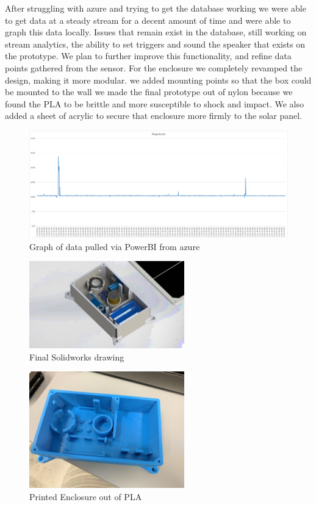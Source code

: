 \documentclass[11pt]{article}
\begin{document}
After struggling with azure and trying to get the database working we were able to get data at a steady stream for a decent amount of time and were able to graph this data locally. Issues that remain exist in the database, still working on stream analytics, the ability to set triggers and sound the speaker that exists on the prototype. We plan to further improve this functionality, and refine data points gathered from the sensor. 
	For the enclosure we completely revamped the design, making it more modular. we added mounting points so that the box could be mounted to the wall we made the final prototype out of nylon because we found the PLA to be brittle and more susceptible to shock and impact. We also added a sheet of acrylic to secure that enclosure more firmly to the solar panel.  
\begin{figure}[H]
\centering
\includegraphics[width=1\textwidth]{grdata_azure}
\caption{Graph of data pulled via PowerBI from azure}
\label{fig:graphical data}
\end{figure}

\begin{figure}[H]
\centering
\includegraphics[width=0.6\textwidth]{final_assembly}
\caption{Final Solidworks drawing }
\label{fig:final_sldrprt}
\end{figure}

\begin{figure}[H]
\centering
\includegraphics[width=0.6\textwidth]{enclosure}
\caption{Printed Enclosure out of PLA}
\label{fig:enclosure}
\end{figure}
\end{document}
